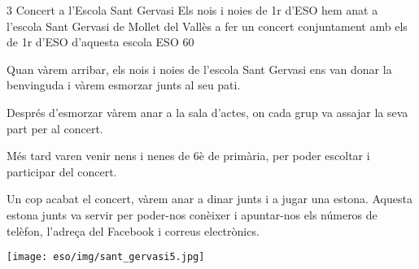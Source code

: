 \begin{news}
{3} %
{Concert a l'Escola Sant Gervasi}
{Els nois i noies de 1r d’ESO hem anat a l’escola Sant Gervasi de Mollet del Vallès a fer un concert conjuntament amb els de 1r d’ESO d’aquesta escola}
{ESO}
{60} %


Quan vàrem arribar, els nois i noies de l’escola Sant Gervasi ens van donar la benvinguda i vàrem esmorzar junts al seu pati.

Després d’esmorzar vàrem anar a la sala d’actes, on cada grup va assajar la seva part per al concert.

Més tard varen venir nens i nenes de 6è de primària, per poder escoltar i participar del concert.

Un cop acabat el concert, vàrem anar a dinar junts i a jugar una estona. Aquesta estona junts va servir per poder-nos conèixer i apuntar-nos els números de telèfon, l’adreça del Facebook i correus electrònics.


\noindent\texttt{[image: eso/img/sant\_gervasi5.jpg]}


\end{news}

